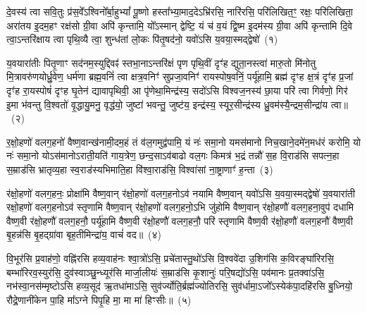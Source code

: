 \setcounter{anuvakam}{0}
दे॒वस्य॑ त्वा सवि॒तुः प्र॑स॒वे᳚\-ऽश्विनो᳚र्बा॒हु\-भ्यां᳚ पू॒ष्णो हस्ता᳚भ्या॒माद॒दे\-ऽभ्रि॑रसि॒ नारि॑रसि॒ परि॑लिखित॒ꣳ॒ रक्षः॒ परि॑लिखिता॒ अरा॑तय इ॒दम॒हꣳ रक्ष॑सो ग्री॒वा अपि॑ कृन्तामि॒ यो᳚\-ऽस्मान् द्वेष्टि॒ यं च॑ व॒यं द्वि॒ष्म इ॒दम॑स्य ग्री॒वा अपि॑ कृन्तामि दि॒वे त्वा॒\-ऽन्तरि॑क्षाय त्वा पृथि॒व्यै त्वा॒ शुन्ध॑तां लो॒कः पि॑तृ॒षद॑नो॒ यवो॑\-ऽसि य॒वया॒स्मद्द्वेषो॑~(१)\ip

य॒वयारा॑तीः पितृ॒णाꣳ सद॑नम॒स्युद्दिवꣴ॑ स्तभा॒ना\-ऽन्तरि॑क्षं पृण पृथि॒वीं दृꣳ॑ह द्युता॒नस्त्वा॑ मारु॒तो मि॑नोतु मि॒त्रावरु॑णयोर्ध्रु॒वेण॒ धर्म॑णा ब्रह्म॒वनिं॑ त्वा क्षत्र॒वनिꣳ॑ सुप्रजा॒वनिꣳ॑ रायस्पोष॒वनिं॒ पर्यू॑हामि॒ ब्रह्म॑ दृꣳह क्ष॒त्रं दृꣳ॑ह प्र॒जां दृꣳ॑ह रा॒यस्पोषं॑ दृꣳह घृ॒तेन॑ द्यावा\-पृथिवी॒ आ पृ॑णेथा॒मिन्द्र॑स्य॒ सदो॑\-ऽसि विश्वज॒नस्य॑ छा॒या परि॑ त्वा गिर्वणो॒ गिर॑ इ॒मा भ॑वन्तु वि॒श्वतो॑ वृ॒द्धायु॒मनु॒ वृद्ध॑यो॒ जुष्टा॑ भवन्तु॒ जुष्ट॑य॒ इन्द्र॑स्य॒ स्यूर॒सीन्द्र॑स्य ध्रु॒वम॑स्यै॒न्द्रम॒सीन्द्रा॑य त्वा॥~(२)\ip

{\anuvakamend[{द्वेष॑ इ॒मा अ॒ष्टाद॑श च}]}

र॒क्षो॒हणो॑ वलग॒हनो॑ वैष्ण॒वान्ख॑नामी॒दम॒हं तं व॑ल॒गमुद्व॑पामि॒ यं नः॑ समा॒नो यमस॑मानो निच॒खाने॒दमे॑न॒मध॑रं करोमि॒ यो नः॑ समा॒नो यो\-ऽस॑मानो\-ऽराती॒यति॑ गाय॒त्रेण॒ छन्द॒सा\-ऽव॑बाढो वल॒गः किमत्र॑ भ॒द्रं तन्नौ॑ स॒ह वि॒राड॑सि सपत्न॒हा स॒म्राड॑सि भ्रातृव्य॒हा स्व॒राड॑स्यभिमाति॒हा वि॑श्वा॒राड॑सि॒ विश्वा॑सां ना॒ष्ट्राणाꣳ॑ ह॒न्ता~(३)\ip

र॑क्षो॒हणो॑ वलग॒हनः॒ प्रोक्षा॑मि वैष्ण॒वान् र॑क्षो॒हणो॑ वलग॒हनो\-ऽव॑ नयामि वैष्ण॒वान् यवो॑\-ऽसि य॒वया॒स्मद्द्वेषो॑ य॒वयारा॑ती रक्षो॒हणो॑ वलग॒हनो\-ऽव॑ स्तृणामि वैष्ण॒वान् र॑क्षो॒हणो॑ वलग॒हनो॒\-ऽभि जु॑होमि वैष्ण॒वान् र॑क्षो॒हणौ॑ वलग॒हना॒वुप॑ दधामि वैष्ण॒वी र॑क्षो॒हणौ॑ वलग॒हनौ॒ पर्यू॑हामि वैष्ण॒वी र॑क्षो॒हणौ॑ वलग॒हनौ॒ परि॑ स्तृणामि वैष्ण॒वी र॑क्षो॒हणौ॑ वलग॒हनौ॑ वैष्ण॒वी बृ॒हन्न॑सि बृ॒हद्ग्रा॑वा बृह॒तीमिन्द्रा॑य॒ वाचं॑ वद॥~(४)\ip

{\anuvakamend[{ह॒न्तेन्द्रा॑य॒ द्वे च॑}]}

वि॒भूर॑सि प्र॒वाह॑णो॒ वह्नि॑रसि हव्य॒वाह॑नः श्वा॒त्रो॑\-ऽसि॒ प्रचे॑तास्तु॒थो॑\-ऽसि वि॒श्ववे॑दा उ॒शिग॑सि क॒विरङ्घा॑रिरसि॒ बम्भा॑रिरव॒स्युर॑सि॒ दुव॑स्वाञ्छु॒न्ध्यूर॑सि मार्जा॒लीयः॑ स॒म्राड॑सि कृ॒शानुः॑ परि॒षद्यो॑\-ऽसि॒ पव॑मानः प्र॒तक्वा॑\-ऽसि॒ नभ॑स्वा॒नस॑म्मृष्टो\-ऽसि हव्य॒सूद॑ ऋ॒तधा॑मा\-ऽसि॒ सुव॑र्ज्योति॒र्ब्रह्म॑ज्योतिरसि॒ सुव॑र्धामा॒\-ऽजो᳚\-ऽस्येक॑पा॒दहि॑रसि बु॒ध्नियो॒ रौद्रे॒णानी॑केन पा॒हि मा᳚\-ऽग्ने पिपृ॒हि मा॒ मा मा॑ हिꣳसीः॥~(५)\ip


